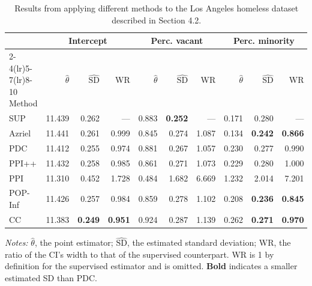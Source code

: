 \begin{table}[tb]
\centering
\caption{Results from applying different methods to the Los Angeles homeless dataset described in Section 4.2.}
\label{tab:la-homeless}
\begin{tabular}{lrrrrrrrrr}
\toprule
 & \multicolumn{3}{c}{Intercept} & \multicolumn{3}{c}{Perc. vacant} & \multicolumn{3}{c}{Perc. minority} \\
\cmidrule(lr){2-4}\cmidrule(lr){5-7}\cmidrule(lr){8-10}
Method & $\hat{\theta}$ & $\widehat{\mathrm{SD}}$ & WR & $\hat{\theta}$ & $\widehat{\mathrm{SD}}$ & WR & $\hat{\theta}$ & $\widehat{\mathrm{SD}}$ & WR \\
\midrule
SUP & 11.439 & 0.262 & --- & 0.883 & \textbf{0.252} & --- & 0.171 & 0.280 & --- \\
Azriel & 11.441 & 0.261 & 0.999 & 0.845 & 0.274 & 1.087 & 0.134 & \textbf{0.242} & \textbf{0.866} \\
PDC & 11.412 & 0.255 & 0.974 & 0.881 & 0.267 & 1.057 & 0.230 & 0.277 & 0.990 \\
PPI++ & 11.432 & 0.258 & 0.985 & 0.861 & 0.271 & 1.073 & 0.229 & 0.280 & 1.000 \\
PPI & 11.310 & 0.452 & 1.728 & 0.484 & 1.682 & 6.669 & 1.232 & 2.014 & 7.201 \\
POP-Inf & 11.426 & 0.257 & 0.984 & 0.859 & 0.278 & 1.102 & 0.208 & \textbf{0.236} & \textbf{0.845} \\
CC & 11.383 & \textbf{0.249} & \textbf{0.951} & 0.924 & 0.287 & 1.139 & 0.262 & \textbf{0.271} & \textbf{0.970} \\
\bottomrule
\end{tabular}
\begin{minipage}{\linewidth}\vspace{2pt}\footnotesize
\textit{Notes:} $\hat{\theta}$, the point estimator; $\widehat{\mathrm{SD}}$, the estimated standard deviation; WR, the ratio of the CI's width to that of the supervised counterpart. WR is 1 by definition for the supervised estimator and is omitted. \textbf{Bold} indicates a smaller estimated SD than PDC.
\end{minipage}
\end{table}
